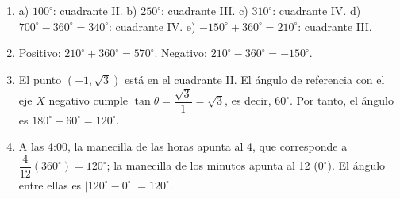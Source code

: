 \documentclass[12pt, letterpaper]{article}
\begin{document}
  \begin{enumerate}[leftmargin=*, label=\textbf{\arabic*.}]
    \item a) $100^{\circ}$: cuadrante II. \quad b) $250^{\circ}$: cuadrante III. \quad c) $310^{\circ}$: cuadrante IV.
          \quad d) $700^{\circ} - 360^{\circ} = 340^{\circ}$: cuadrante IV.
          \quad e) $-150^{\circ} + 360^{\circ} = 210^{\circ}$: cuadrante III.

    \item Positivo: $210^{\circ} + 360^{\circ} = 570^{\circ}$. \quad Negativo: $210^{\circ} - 360^{\circ} = -150^{\circ}$.

    \item El punto $(-1, \sqrt{3})$ está en el cuadrante II. El ángulo de referencia con el eje $X$ negativo cumple $\tan \theta = \dfrac{\sqrt{3}}{1} = \sqrt{3}$, es decir, $60^{\circ}$. Por tanto, el ángulo es $180^{\circ} - 60^{\circ} = 120^{\circ}$.

    \item A las 4:00, la manecilla de las horas apunta al 4, que corresponde a $\dfrac{4}{12}(360^{\circ}) = 120^{\circ}$; la manecilla de los minutos apunta al 12 ($0^{\circ}$). El ángulo entre ellas es $|120^{\circ} - 0^{\circ}| = 120^{\circ}$.
  \end{enumerate}

\fi
\end{document}

